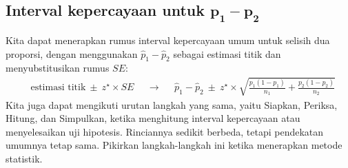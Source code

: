 

\subsection[Interval kepercayaan untuk $p_1 - p_2$]
    {Interval kepercayaan untuk $\pmb{p_1 - p_2}$}


\noindent%
Kita dapat menerapkan rumus interval kepercayaan umum
untuk selisih dua proporsi,
dengan menggunakan $\hat{p}_1 - \hat{p}_2$ sebagai estimasi
titik dan menyubstitusikan rumus $SE$:
\begin{align*}
&\text{estimasi titik} \ \pm\  z^{\star} \times SE
&&\to
&&\hat{p}_1 - \hat{p}_2 \ \pm\ 
    z^{\star} \times
   \sqrt{\frac{p_1(1-p_1)}{n_1} + \frac{p_2(1-p_2)}{n_2}}
\end{align*}
Kita juga dapat mengikuti urutan langkah yang sama, yaitu
Siapkan, Periksa, Hitung, dan Simpulkan, ketika
menghitung interval kepercayaan
atau menyelesaikan uji hipotesis.
Rinciannya sedikit berbeda,
tetapi pendekatan umumnya tetap sama.
Pikirkan langkah-langkah ini ketika menerapkan metode statistik.

